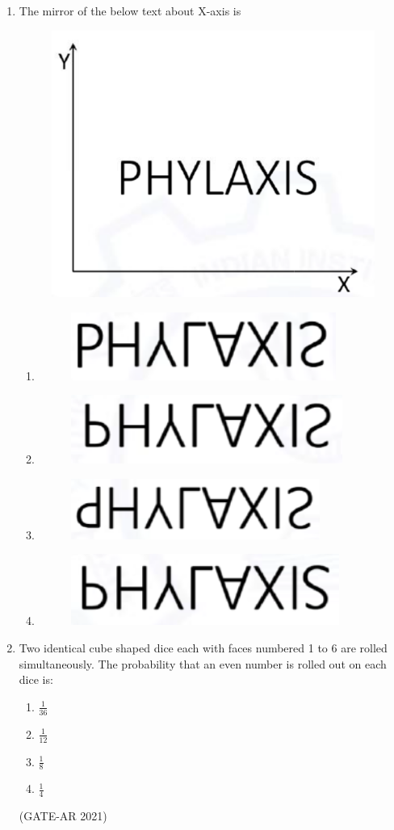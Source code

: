 \documentclass[a4paper,10pt]{article}
\begin{document}
\begin{enumerate}
    \item The mirror of the below text about X-axis is \\
    \begin{figure}[h!]
    \centering
    \includegraphics[width=0.3\columnwidth]{figs/01.jpg}
    \caption{}
    \label{fig:Img01}
    \end{figure}
    \begin{enumerate}
    \item \begin{figure}[h!]
    \centering
    \includegraphics[width=0.1\columnwidth]{figs/02.jpg}
    \caption{}
    \label{fig:Img02}
    \end{figure}
    \item \begin{figure}[h!]
    \centering
    \includegraphics[width=0.1\columnwidth]{figs/03.jpg}
    \caption{}
    \label{fig:Img03}
    \end{figure}
    \item \begin{figure}[h!]
    \centering
    \includegraphics[width=0.1\columnwidth]{figs/04.jpg}
    \caption{}
    \label{fig:Img04}
    \end{figure}
    \item \begin{figure}[h!]
    \centering
    \includegraphics[width=0.1\columnwidth]{figs/05.jpg}
    \caption{}
    \label{fig:Img05}
    \end{figure}
    \end{enumerate}
    
    \item Two identical cube shaped dice each with faces numbered 1 to 6 are rolled simultaneously. The probability that an even number is rolled out on each dice is:
    \begin{multicols}{4}
    \begin{enumerate}
        \item $\frac{1}{36}$
        \item $\frac{1}{12}$
        \item $\frac{1}{8}$
        \item $\frac{1}{4}$
    \end{enumerate}
    \end{multicols}
    \hfill (GATE-AR 2021)


\end{enumerate}
\end{document}
